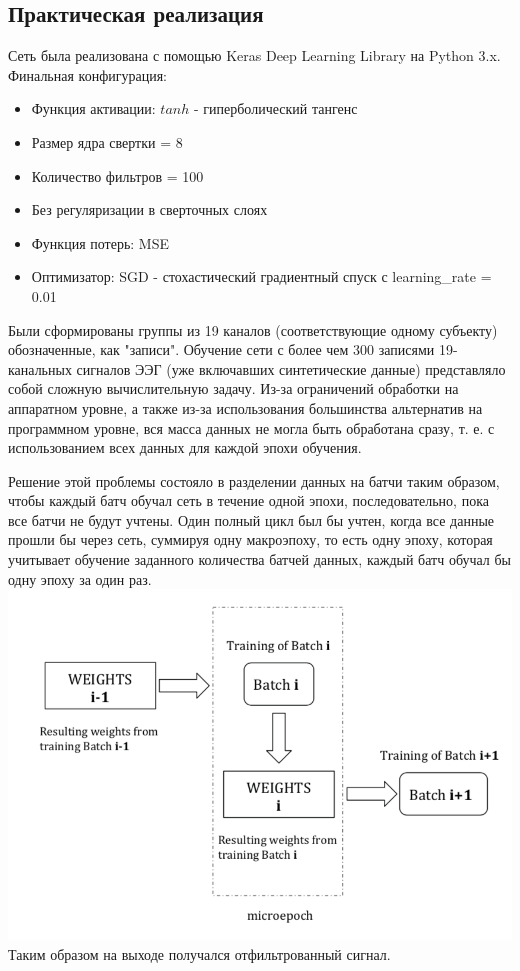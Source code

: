 \documentclass[12pt, a4paper, titlepage]{extreport}
\begin{document}
	\subsection*{Практическая реализация}
	Сеть была реализована с помощью Keras Deep Learning Library на Python 3.x. Финальная конфигурация:
	\begin{itemize}
		\item Функция активации: $tanh$ - гиперболический тангенс
		\item Размер ядра свертки = 8
		\item Количество фильтров = 100
		\item Без регуляризации в сверточных слоях
		\item Функция потерь: MSE
		\item Оптимизатор: SGD - стохастический градиентный спуск с learning\_rate = 0.01
	\end{itemize}
	Были сформированы группы из 19 каналов (соответствующие одному субъекту) обозначенные, как "записи". Обучение сети с более чем 300 записями 19-канальных сигналов ЭЭГ (уже включавших синтетические данные) представляло собой сложную вычислительную задачу. Из-за ограничений обработки на аппаратном уровне, а также из-за использования большинства альтернатив на программном уровне, вся масса данных не могла быть обработана сразу, т. е. с использованием всех данных для каждой эпохи обучения.
	
	Решение этой проблемы состояло в разделении данных на батчи таким образом, чтобы каждый батч обучал сеть в течение одной эпохи, последовательно, пока все батчи не будут учтены. Один полный цикл был бы учтен, когда все данные прошли бы через сеть, суммируя одну макроэпоху, то есть одну эпоху, которая учитывает обучение заданного количества батчей данных, каждый батч обучал бы одну эпоху за один раз.\\
	\includegraphics[scale=1]{batch_scheme.png}
	\\
	Таким образом на выходе получался отфильтрованный сигнал.
\end{document}
